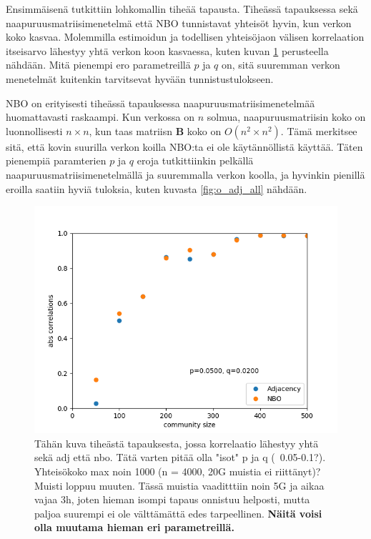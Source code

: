 \documentclass[finnish,12pt,a4paper,pdftex,sci,utf8]{aaltothesis}
\begin{document}
Ensimmäisenä tutkittiin lohkomallin tiheää tapausta. Tiheässä tapauksessa sekä naapuruusmatriisimenetelmä että NBO tunnistavat yhteisöt hyvin, kun verkon koko kasvaa. Molemmilla estimoidun ja todellisen yhteisöjaon välisen korrelaation itseisarvo lähestyy yhtä verkon koon kasvaessa, kuten kuvan \ref{fig:dense} perusteella nähdään. Mitä pienempi ero parametreillä $p$ ja $q$ on, sitä suuremman verkon menetelmät kuitenkin tarvitsevat hyvään tunnistustulokseen.

NBO on erityisesti tiheässä tapauksessa naapuruusmatriisimenetelmää huomattavasti raskaampi. Kun verkossa on $n$ solmua, naapuruusmatriisin koko on luonnollisesti $n \times n$, kun taas matriisn $\mathbf{B}$ koko on $O(n^2 \times n^2)$. Tämä merkitsee sitä, että kovin suurilla verkon koilla NBO:ta ei ole käytännöllistä käyttää. Täten pienempiä paramterien $p$ ja $q$ eroja tutkittiinkin pelkällä naapuruusmatriisimenetelmällä ja suuremmalla verkon koolla, ja hyvinkin pienillä eroilla saatiin hyviä tuloksia, kuten kuvasta \ref{fig:o_adj_all} nähdään.

\begin{figure}
	\centering
	\includegraphics{adj_nbo_den_1.png}
	\caption{Tähän kuva tiheästä tapauksesta, jossa korrelaatio lähestyy yhtä sekä adj että nbo. Tätä varten pitää olla "isot" p ja q (~0.05-0.1?). Yhteisökoko max noin 1000 (n = 4000, 20G muistia ei riittänyt)? Muisti loppuu muuten. Tässä muistia vaaditttiin noin 5G ja aikaa vajaa 3h, joten hieman isompi tapaus onnistuu helposti, mutta paljoa suurempi ei ole välttämättä edes tarpeellinen. \textbf{Näitä voisi olla muutama hieman eri parametreillä.}}
	\label{fig:dense}
\end{figure}
\end{document}
